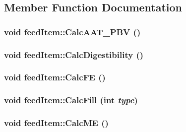 \subsection{Member Function Documentation}
\hypertarget{classfeed_item_ab684796df8e02d6ba66bbf0c39328dc5}{
\subsubsection[{CalcAAT\_\-PBV}]{\setlength{\rightskip}{0pt plus 5cm}void feedItem::CalcAAT\_\-PBV ()}}
\label{classfeed_item_ab684796df8e02d6ba66bbf0c39328dc5}
\hypertarget{classfeed_item_a86cf44036c42020b4760d1e9b79f2bd1}{
\subsubsection[{CalcDigestibility}]{\setlength{\rightskip}{0pt plus 5cm}void feedItem::CalcDigestibility ()}}
\label{classfeed_item_a86cf44036c42020b4760d1e9b79f2bd1}
\hypertarget{classfeed_item_a638c45c2e59d81f7e21cd92b511db906}{
\subsubsection[{CalcFE}]{\setlength{\rightskip}{0pt plus 5cm}void feedItem::CalcFE ()}}
\label{classfeed_item_a638c45c2e59d81f7e21cd92b511db906}
\hypertarget{classfeed_item_a1df09eb5f68546dac21b1088cee22cea}{
\subsubsection[{CalcFill}]{\setlength{\rightskip}{0pt plus 5cm}void feedItem::CalcFill (int {\em type})}}
\label{classfeed_item_a1df09eb5f68546dac21b1088cee22cea}
\hypertarget{classfeed_item_a65b1eff694520848d90bcecad5f1c317}{
\subsubsection[{CalcME}]{\setlength{\rightskip}{0pt plus 5cm}void feedItem::CalcME ()}}
